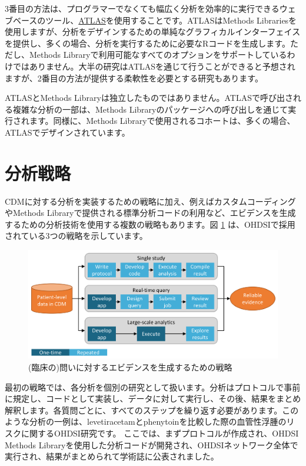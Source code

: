 \documentclass[
  11pt]{book}
\theoremstyle{definition}
\theoremstyle{definition}
\theoremstyle{definition}
\theoremstyle{definition}
\theoremstyle{remark}
\begin{document}
3番目の方法は、プログラマーでなくても幅広く分析を効率的に実行できるウェブベースのツール、\href{https://github.com/OHDSI/Atlas/wiki}{ATLAS}を使用することです。ATLASはMethods Librariesを使用しますが、分析をデザインするための単純なグラフィカルインターフェイスを提供し、多くの場合、分析を実行するために必要なRコードを生成します。ただし、Methods Libraryで利用可能なすべてのオプションをサポートしているわけではありません。大半の研究はATLASを通じて行うことができると予想されますが、2番目の方法が提供する柔軟性を必要とする研究もあります。

ATLASとMethods Libraryは独立したものではありません。ATLASで呼び出される複雑な分析の一部は、Methods Libraryのパッケージへの呼び出しを通じて実行されます。同様に、Methods Libraryで使用されるコホートは、多くの場合、ATLASでデザインされています。

\section{分析戦略}\label{ux5206ux6790ux6226ux7565}

CDMに対する分析を実装するための戦略に加え、例えばカスタムコーディングやMethods Libraryで提供される標準分析コードの利用など、エビデンスを生成するための分析技術を使用する複数の戦略もあります。図 \ref{fig:strategies} は、OHDSIで採用されている3つの戦略を示しています。

\begin{figure}

{\centering \includegraphics[width=0.9\linewidth]{images/OhdsiAnalyticsTools/strategies} 

}

\caption{(臨床の)問いに対するエビデンスを生成するための戦略}\label{fig:strategies}
\end{figure}

最初の戦略では、各分析を個別の研究として扱います。分析はプロトコルで事前に規定し、コードとして実装し、データに対して実行し、その後、結果をまとめ解釈します。各質問ごとに、すべてのステップを繰り返す必要があります。このような分析の一例は、levetiracetamとphenytoinを比較した際の血管性浮腫のリスクに関するOHDSI研究です\citep{duke_2017}。 ここでは、まずプロトコルが作成され、OHDSI Methods Libraryを使用した分析コードが開発され、OHDSIネットワーク全体で実行され、結果がまとめられて学術誌に公表されました。
\end{document}
